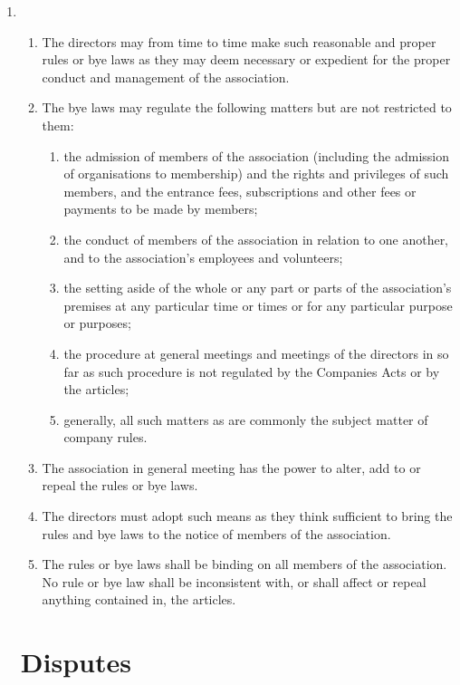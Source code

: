 \begin{enumerate}
\item
  \begin{enumerate}
  \item
    The directors may from time to time make such reasonable and proper
    rules or bye laws as they may deem necessary or expedient for the
    proper conduct and management of the association.
  \item
    The bye laws may regulate the following matters but are not
    restricted to them:
    \begin{enumerate}
    \item
      the admission of members of the association (including the admission of
      organisations to membership) and the rights and privileges of such
      members, and the entrance fees, subscriptions and other fees or
      payments to be made by members;
    \item
      the conduct of members of the association in relation to one another,
      and to the association's employees and volunteers;
    \item
      the setting aside of the whole or any part or parts of the
      association's premises at any particular time or times or for any
      particular purpose or purposes;
    \item
      the procedure at general meetings and meetings of the directors in
      so far as such procedure is not regulated by the Companies Acts or
      by the articles;
    \item
      generally, all such matters as are commonly the subject matter of
      company rules.
    \end{enumerate}
  \item
    The association in general meeting has the power to alter, add to or
    repeal the rules or bye laws.
  \item
    The directors must adopt such means as they think sufficient to
    bring the rules and bye laws to the notice of members of the
    association.
  \item
    The rules or bye laws shall be binding on all members of the
    association. No rule or bye law shall be inconsistent with, or shall
    affect or repeal anything contained in, the articles.
  \end{enumerate}

\section{Disputes}


\end{enumerate}

